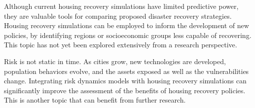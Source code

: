 Although current housing recovery simulations have limited predictive power, they are valuable tools for comparing proposed disaster recovery strategies. Housing recovery simulations can be employed to inform the development of new policies, by identifying regions or socioeconomic groups less capable of recovering. This topic has not yet been explored extensively from a research perspective.\ 

Risk is not static in time. As cities grow, new technologies are developed, population behaviors evolve, and the assets exposed as well as the vulnerabilities change. Integrating risk dynamics models with housing recovery simulations can significantly improve the assessment of the benefits of housing recovery policies. This is another topic that can benefit from further research.\





